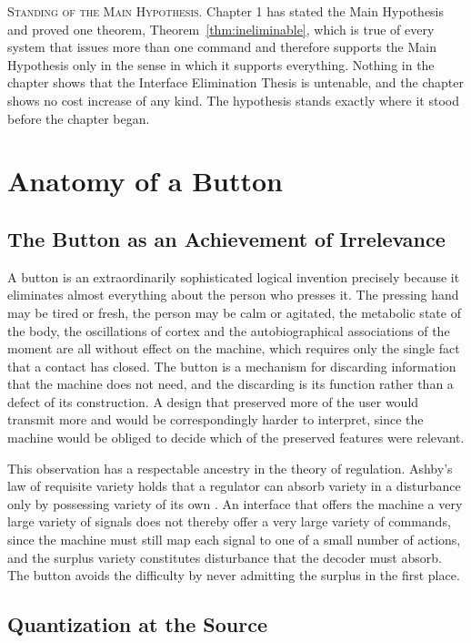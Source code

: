 \documentclass[11pt,twoside,openany]{book}
\theoremstyle{definition}
\theoremstyle{remark}
\newenvironment{standing}{\par\medskip\noindent\hrulefill\par\smallskip\noindent\textsc{Standing of the Main Hypothesis.}\enspace}{\par\smallskip\noindent\hrulefill\par\medskip}
\begin{document}
\begin{standing}
Chapter 1 has stated the Main Hypothesis and proved one theorem, Theorem~\ref{thm:ineliminable}, which is true of every system that issues more than one command and therefore supports the Main Hypothesis only in the sense in which it supports everything. Nothing in the chapter shows that the Interface Elimination Thesis is untenable, and the chapter shows no cost increase of any kind. The hypothesis stands exactly where it stood before the chapter began.
\end{standing}

\chapter{Anatomy of a Button}

\section{The Button as an Achievement of Irrelevance}

A button is an extraordinarily sophisticated logical invention precisely because it eliminates almost everything about the person who presses it. The pressing hand may be tired or fresh, the person may be calm or agitated, the metabolic state of the body, the oscillations of cortex and the autobiographical associations of the moment are all without effect on the machine, which requires only the single fact that a contact has closed. The button is a mechanism for discarding information that the machine does not need, and the discarding is its function rather than a defect of its construction. A design that preserved more of the user would transmit more and would be correspondingly harder to interpret, since the machine would be obliged to decide which of the preserved features were relevant.

This observation has a respectable ancestry in the theory of regulation. Ashby's law of requisite variety holds that a regulator can absorb variety in a disturbance only by possessing variety of its own \cite{ashby1956}. An interface that offers the machine a very large variety of signals does not thereby offer a very large variety of commands, since the machine must still map each signal to one of a small number of actions, and the surplus variety constitutes disturbance that the decoder must absorb. The button avoids the difficulty by never admitting the surplus in the first place.

\section{Quantization at the Source}
\end{document}
